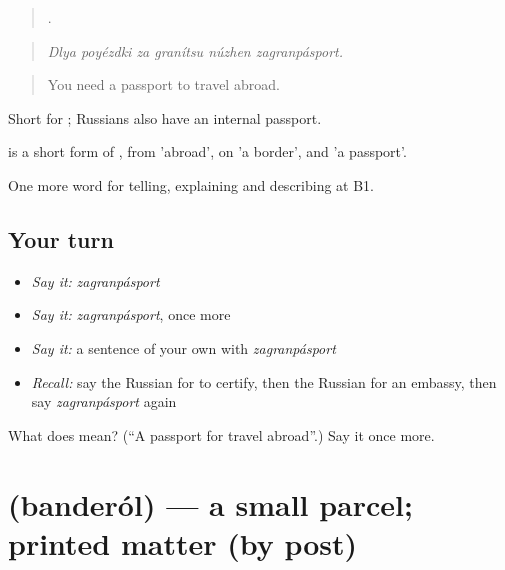 \begin{quote}
     .
\end{quote}

\begin{quote}
\emph{Dlya poyézdki za granítsu núzhen zagranpásport.}
\end{quote}

\begin{quote}
You need a passport to travel abroad.
\end{quote}

Short for \emph{ }; Russians also have an internal passport.

\begin{cousinweb}
\emph{} is a short form of \emph{ }, from \emph{ } 'abroad', on \emph{} 'a border', and \emph{} 'a passport'.
\end{cousinweb}

\begin{grammarlens}[title={What you've built}]
One more word for telling, explaining and describing at B1.
\end{grammarlens}

\subsection*{Your turn}
\begin{itemize}
\raggedright
  \item \emph{Say it:} \emph{zagranpásport}
  \item \emph{Say it:} \emph{zagranpásport}, once more
  \item \emph{Say it:} a sentence of your own with \emph{zagranpásport}
  \item \emph{Recall:} say the Russian for to certify, then the Russian for an embassy, then say \emph{zagranpásport} again
\end{itemize}

\begin{tcolorbox}[breakable,colback=teal!4,colframe=teal!35!black,title={Before you move on}]
What does  mean? (\textquotedblleft{}A passport for travel abroad\textquotedblright{}.) Say it once more.
\end{tcolorbox}
\section[\texorpdfstring{\ru{бандероль} (banderól)}{бандероль (banderól)}]{ (banderól) — a small parcel; printed matter (by post)}


